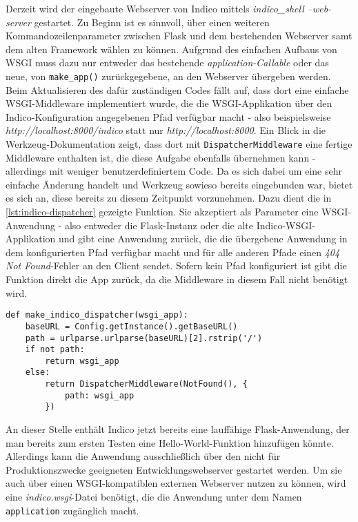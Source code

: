 Derzeit wird der eingebaute Webserver von Indico mittels \emph{indico\_shell --web-server}
gestartet. Zu Beginn ist es sinnvoll, über einen weiteren Kommandozeilenparameter zwischen Flask und
dem bestehenden Webserver samt dem alten Framework wählen zu können. Aufgrund des einfachen Aufbaus
von WSGI muss dazu nur entweder das bestehende \emph{application-Callable} oder das neue, von
\lstinline{make_app()} zurückgegebene, an den Webserver übergeben werden. Beim Aktualisieren des
dafür zuständigen Codes fällt auf, dass dort eine einfache WSGI-Middleware implementiert wurde, die
die WSGI-Applikation über den Indico-Konfiguration angegebenen Pfad verfügbar macht - also
beispielsweise \emph{http://localhost:8000/indico} statt nur \emph{http://localhost:8000}. Ein Blick
in die Werkzeug-Dokumentation zeigt, dass dort mit \lstinline{DispatcherMiddleware} eine fertige
Middleware enthalten ist, die diese Aufgabe ebenfalls übernehmen kann - allerdings mit weniger
benutzerdefiniertem Code. Da es sich dabei um eine sehr einfache Änderung handelt und Werkzeug
sowieso bereits eingebunden war, bietet es sich an, diese bereits zu diesem Zeitpunkt vorzunehmen.
Dazu dient die in \autoref{lst:indico-dispatcher} gezeigte Funktion. Sie akzeptiert als Parameter
eine WSGI-Anwendung - also entweder die Flask-Instanz oder die alte Indico-WSGI-Applikation und gibt
eine Anwendung zurück, die die übergebene Anwendung in dem konfigurierten Pfad verfügbar macht und
für alle anderen Pfade einen \emph{404 Not Found}-Fehler an den Client sendet. Sofern kein Pfad
konfiguriert ist gibt die Funktion direkt die App zurück, da die Middleware in diesem Fall nicht
benötigt wird.

\begin{lstlisting}[caption=Indico-WSGI-Dispatcher,label=lst:indico-dispatcher]
def make_indico_dispatcher(wsgi_app):
    baseURL = Config.getInstance().getBaseURL()
    path = urlparse.urlparse(baseURL)[2].rstrip('/')
    if not path:
        return wsgi_app
    else:
        return DispatcherMiddleware(NotFound(), {
            path: wsgi_app
        })
\end{lstlisting}

An dieser Stelle enthält Indico jetzt bereits eine lauffähige Flask-Anwendung, der man bereits zum
ersten Testen eine Hello-World-Funktion hinzufügen könnte. Allerdings kann die Anwendung
ausschließlich über den nicht für Produktionszwecke geeigneten Entwicklungswebserver gestartet
werden. Um sie auch über einen WSGI-kompatiblen externen Webserver nutzen zu können, wird eine
\emph{indico.wsgi}-Datei benötigt, die die Anwendung unter dem Namen \lstinline{application}
zugänglich macht.

